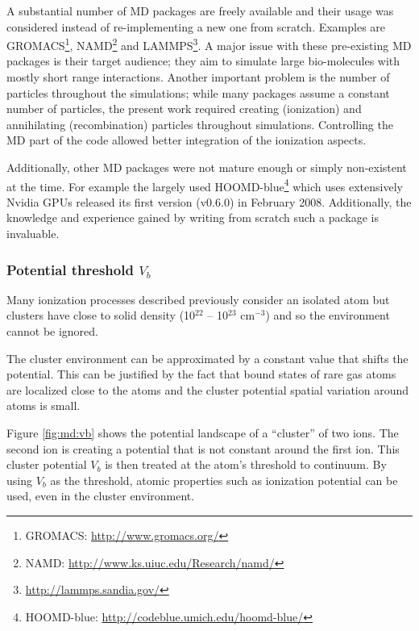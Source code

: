 A substantial number of MD packages are freely available and
their usage was considered instead of re-implementing a new one from scratch.
Examples are GROMACS\footnote{GROMACS:
\url{http://www.gromacs.org/}}, NAMD\footnote{NAMD:
\url{http://www.ks.uiuc.edu/Research/namd/}} and
LAMMPS\footnote{\url{http://lammps.sandia.gov/}}. A major issue with these
pre-existing MD packages is their target audience; they aim to simulate large
bio-molecules with mostly short range interactions. Another important problem
is the number of particles throughout the simulations; while many packages
assume a constant number of particles, the present work required creating
(ionization) and annihilating (recombination) particles throughout simulations.
Controlling the MD part of the code allowed better integration of the
ionization aspects.

Additionally, other MD packages were not mature enough or simply non-existent at the time.
For example the largely used HOOMD-blue\footnote{HOOMD-blue:
\url{http://codeblue.umich.edu/hoomd-blue/}} which uses extensively
Nvidia GPUs released its first version (v0.6.0) in February 2008.
Additionally, the knowledge and experience gained by writing from scratch such
a package is invaluable.






\subsubsection{Potential threshold $V_b$}
\label{section:intro:Vb}

Many ionization processes described previously consider an isolated atom but
clusters have close to solid density (10$^{22}$ -- 10$^{23}$ cm$^{-3}$) and
so the environment cannot be ignored.

The cluster environment can be approximated by a constant value that shifts the
potential\cite{Fennel2007}. This can be justified by the fact that bound states
of rare gas atoms are localized close to the atoms and the cluster potential
spatial variation around atoms is small.

Figure \ref{fig:md:vb} shows the potential landscape of a ``cluster'' of two
ions. The second ion is creating a potential that is not constant around the
first ion. This cluster potential $V_b$ is then treated at the atom's threshold
to continuum. By using $V_b$ as the threshold, atomic properties such as
ionization potential can be used, even in the cluster environment.

